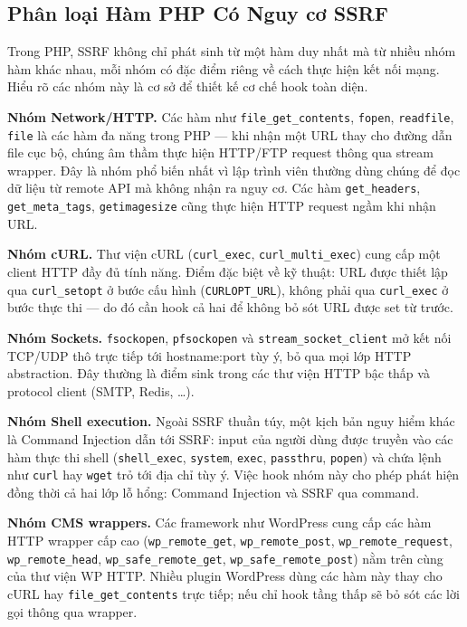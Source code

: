 \subsection{Phân loại Hàm PHP Có Nguy cơ SSRF}

Trong PHP, SSRF không chỉ phát sinh từ một hàm duy nhất mà từ nhiều nhóm
hàm khác nhau, mỗi nhóm có đặc điểm riêng về cách thực hiện kết nối
mạng. Hiểu rõ các nhóm này là cơ sở để thiết kế cơ chế hook toàn diện.

\textbf{Nhóm Network/HTTP.} Các hàm như \texttt{file\_get\_contents},
\texttt{fopen}, \texttt{readfile}, \texttt{file} là các hàm đa năng trong
PHP --- khi nhận một URL thay cho đường dẫn file cục bộ, chúng âm thầm thực
hiện HTTP/FTP request thông qua stream wrapper. Đây là nhóm phổ biến nhất vì
lập trình viên thường dùng chúng để đọc dữ liệu từ remote API mà không nhận
ra nguy cơ. Các hàm \texttt{get\_headers}, \texttt{get\_meta\_tags},
\texttt{getimagesize} cũng thực hiện HTTP request ngầm khi nhận URL.

\textbf{Nhóm cURL.} Thư viện cURL (\texttt{curl\_exec},
\texttt{curl\_multi\_exec}) cung cấp một client HTTP đầy đủ tính năng. Điểm
đặc biệt về kỹ thuật: URL được thiết lập qua \texttt{curl\_setopt} ở bước
cấu hình (\texttt{CURLOPT\_URL}), không phải qua \texttt{curl\_exec} ở bước
thực thi --- do đó cần hook cả hai để không bỏ sót URL được set từ trước.

\textbf{Nhóm Sockets.} \texttt{fsockopen}, \texttt{pfsockopen} và
\texttt{stream\_socket\_client} mở kết nối TCP/UDP thô trực tiếp tới
hostname:port tùy ý, bỏ qua mọi lớp HTTP abstraction. Đây thường là điểm
sink trong các thư viện HTTP bậc thấp và protocol client (SMTP, Redis, \ldots).

\textbf{Nhóm Shell execution.} Ngoài SSRF thuần túy, một kịch bản nguy hiểm
khác là Command Injection dẫn tới SSRF: input của người dùng được truyền vào
các hàm thực thi shell (\texttt{shell\_exec}, \texttt{system}, \texttt{exec},
\texttt{passthru}, \texttt{popen}) và chứa lệnh như \texttt{curl} hay
\texttt{wget} trỏ tới địa chỉ tùy ý. Việc hook nhóm này cho phép phát hiện
đồng thời cả hai lớp lỗ hổng: Command Injection và SSRF qua command.

\textbf{Nhóm CMS wrappers.} Các framework như WordPress cung cấp các hàm
HTTP wrapper cấp cao (\texttt{wp\_remote\_get}, \texttt{wp\_remote\_post},
\texttt{wp\_remote\_request}, \texttt{wp\_remote\_head}, \texttt{wp\_safe\_remote\_get},
\texttt{wp\_safe\_remote\_post}) nằm trên cùng của thư viện WP HTTP. Nhiều
plugin WordPress dùng các hàm này thay cho cURL hay \texttt{file\_get\_contents}
trực tiếp; nếu chỉ hook tầng thấp sẽ bỏ sót các lời gọi thông qua wrapper.

